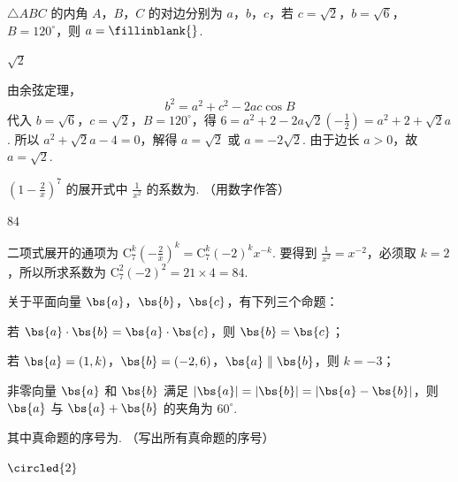 \begin{problem}
\(\triangle ABC\) 的内角 \(A\)，\(B\)，\(C\) 的对边分别为 \(a\)，\(b\)，\(c\)，若 \(c = \sqrt{2}\)，\(b = \sqrt{6}\)，\(B = 120^{\circ}\)，则 \(a =\fillinblank{}\).
\end{problem}

\begin{answer}
\(\sqrt{2}\)
\end{answer}

\begin{solution}
由余弦定理，
\[
b^2=a^2+c^2-2ac\cos B
\]
代入 \(b=\sqrt{6}\)，\(c=\sqrt{2}\)，\(B=120^{\circ}\)，得
\(6=a^2+2-2a\sqrt{2}\left(-\frac{1}{2}\right)=a^2+2+\sqrt{2}a\).
所以 \(a^2+\sqrt{2}a-4=0\)，解得
\(a=\sqrt{2}\) 或 \(a=-2\sqrt{2}\). 由于边长 \(a>0\)，故 \(a=\sqrt{2}\).
\end{solution}

\begin{problem}
\(\left(1 - \frac{2}{x}\right)^7\) 的展开式中 \(\frac{1}{x^2}\) 的系数为\fillinblank{}. （用数字作答）
\end{problem}

\begin{answer}
\(84\)
\end{answer}

\begin{solution}
二项式展开的通项为
\(\mathrm C_7^k\left(-\frac{2}{x}\right)^k=\mathrm C_7^k(-2)^k x^{-k}\).
要得到 \(\frac{1}{x^2}=x^{-2}\)，必须取 \(k=2\)，所以所求系数为
\(\mathrm C_7^2(-2)^2=21\times4=84\).
\end{solution}

\begin{problem}
关于平面向量 \(\bs{a}\)，\(\bs{b}\)，\(\bs{c}\)，有下列三个命题：

\begin{circlelist}
\item 若 \(\bs{a} \cdot \bs{b} = \bs{a} \cdot \bs{c}\)，则 \(\bs{b} = \bs{c}\)；
\item 若 \(\bs{a} = (1, k)\)，\(\bs{b} = (-2, 6)\)，\(\bs{a} \parallel \bs{b}\)，则 \(k = -3\)；
\item 非零向量 \(\bs{a}\) 和 \(\bs{b}\) 满足 \( |\bs{a}| = |\bs{b}| = |\bs{a} - \bs{b}| \)，则 \(\bs{a}\) 与 \( \bs{a} + \bs{b} \) 的夹角为 \( 60^{\circ} \).
\end{circlelist}

其中真命题的序号为\fillinblank{}. （写出所有真命题的序号）
\end{problem}

\begin{answer}
\(\circled{2}\)
\end{answer}

